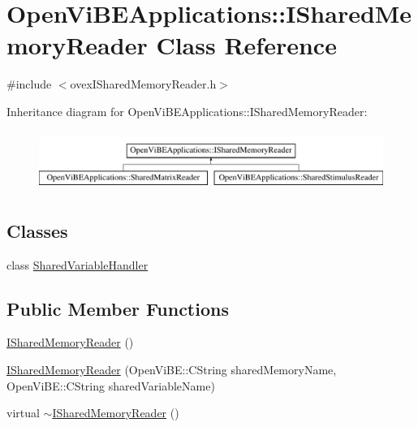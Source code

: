\hypertarget{classOpenViBEApplications_1_1ISharedMemoryReader}{
\section{OpenViBEApplications::ISharedMemoryReader Class Reference}
\label{classOpenViBEApplications_1_1ISharedMemoryReader}
}


{\ttfamily \#include $<$ovexISharedMemoryReader.h$>$}

Inheritance diagram for OpenViBEApplications::ISharedMemoryReader:\begin{figure}[H]
\begin{center}
\leavevmode
\includegraphics[height=1.964912cm]{classOpenViBEApplications_1_1ISharedMemoryReader}
\end{center}
\end{figure}
\subsection*{Classes}
\begin{DoxyCompactItemize}
\item 
class \hyperlink{classOpenViBEApplications_1_1ISharedMemoryReader_1_1SharedVariableHandler}{SharedVariableHandler}
\end{DoxyCompactItemize}
\subsection*{Public Member Functions}
\begin{DoxyCompactItemize}
\item 
\hyperlink{classOpenViBEApplications_1_1ISharedMemoryReader_a509a95943a87fd0774c9e795b47dde46}{ISharedMemoryReader} ()
\item 
\hyperlink{classOpenViBEApplications_1_1ISharedMemoryReader_ad952bf8861a4f4101eb0f3f0563ac828}{ISharedMemoryReader} (OpenViBE::CString sharedMemoryName, OpenViBE::CString sharedVariableName)
\item 
virtual \hyperlink{classOpenViBEApplications_1_1ISharedMemoryReader_abdbc7688210a2f0519f14f78368c9609}{$\sim$ISharedMemoryReader} ()
\end{DoxyCompactItemize}
